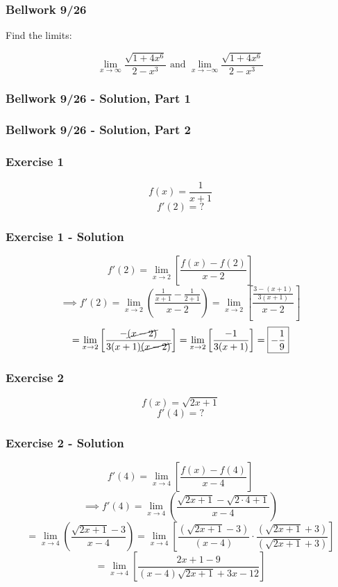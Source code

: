 \documentclass[12pt]{beamer}
\begin{document}
\begin{frame}
	\frametitle{Bellwork 9/26}
	\initclock

	\vfill
	\vfill
	\Large
	Find the limits:\par
	\[\displaystyle\lim_{x\to \infty}\frac{\sqrt{1+4x^6}}{2-x^3}\text{ and }\displaystyle\lim_{x\to -\infty}\frac{\sqrt{1+4x^6}}{2-x^3}\]
	\vfill
	\vfill
	\vfill

	\small
	\crono
\end{frame}
\begin{frame}
	\frametitle{Bellwork 9/26 - Solution, Part 1}


\end{frame}\begin{frame}
	\frametitle{Bellwork 9/26 - Solution, Part 2}


\end{frame}
\begin{frame}
	\frametitle{Exercise 1}

	\vfill
	\LARGE
	\[f(x) = \frac{1}{x+1}\]
	\vfill
	\Large
	\[f'(2)=\text{?}\]
	\vfill
	\vfill
\end{frame}
\begin{frame}
	\frametitle{Exercise 1 - Solution}

	\large %
	\[f'(2)=\displaystyle\lim_{x\to2}\left[\frac{f(x)-f(2)}{x-2}\right]\]
	\[\implies f'(2)=\displaystyle\lim_{x\to2}\left(\frac{\frac{1}{x+1}-\frac{1}{2+1}}{x-2}\right)=\displaystyle\lim_{x\to2}\left[\frac{\frac{3-(x+1)}{3(x+1)}}{x-2}\right]\]
	\[=\displaystyle\lim_{x\to2}\left[\frac{-\cancel{(x-2)}}{3(x+1)\cancel{(x-2)}}\right]=\displaystyle\lim_{x\to2}\left[\frac{-1}{3(x+1)}\right]=\boxed{-\frac{1}{9}}\]
\end{frame}
\begin{frame}
	\frametitle{Exercise 2}

	\vfill
	\LARGE
	\[f(x) = \sqrt{2x+1}\]
	\vfill
	\Large
	\[f'(4)=\text{?}\]
	\vfill
	\vfill
\end{frame}
\begin{frame}
	\frametitle{Exercise 2 - Solution}

	\large
	\[f'(4)=\displaystyle\lim_{x\to4}\left[\frac{f(x)-f(4)}{x-4}\right]\]
	\vfill
	\small
	\[\implies f'(4)=\displaystyle\lim_{x\to4}\left(\frac{\sqrt{2x+1}-\sqrt{2\cdot4+1}}{x-4}\right)\]
	\[=\displaystyle\lim_{x\to4}\left(\frac{\sqrt{2x+1}-3}{x-4}\right)=\displaystyle\lim_{x\to4}\left[\frac{(\sqrt{2x+1}-3)}{(x-4)}\cdot \frac{(\sqrt{2x+1}+3)}{(\sqrt{2x+1}+3)}\right]\]
	\[=\displaystyle\lim_{x\to4}\left[\frac{2x+1-9}{(x-4)\sqrt{2x+1}+3x-12}\right]\]
	\vfill
\end{frame}
\end{document}
